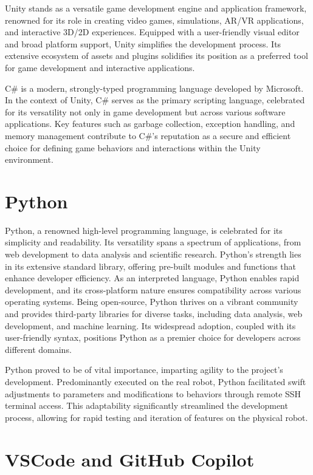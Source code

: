 \documentclass{Configuration_Files/PoliMi3i_thesis}
\begin{document}
Unity stands as a versatile game development engine and application framework, renowned for its role in creating video games, simulations, AR/VR applications, and interactive 3D/2D experiences. Equipped with a user-friendly visual editor and broad platform support, Unity simplifies the development process. Its extensive ecosystem of assets and plugins solidifies its position as a preferred tool for game development and interactive applications.

C\# is a modern, strongly-typed programming language developed by Microsoft. In the context of Unity, C\# serves as the primary scripting language, celebrated for its versatility not only in game development but across various software applications. Key features such as garbage collection, exception handling, and memory management contribute to C\#'s reputation as a secure and efficient choice for defining game behaviors and interactions within the Unity environment.

 

\section{Python}

Python, a renowned high-level programming language, is celebrated for its simplicity and readability. Its versatility spans a spectrum of applications, from web development to data analysis and scientific research. Python's strength lies in its extensive standard library, offering pre-built modules and functions that enhance developer efficiency. As an interpreted language, Python enables rapid development, and its cross-platform nature ensures compatibility across various operating systems. Being open-source, Python thrives on a vibrant community and provides third-party libraries for diverse tasks, including data analysis, web development, and machine learning. Its widespread adoption, coupled with its user-friendly syntax, positions Python as a premier choice for developers across different domains.

Python proved to be of vital importance, imparting agility to the project's development. Predominantly executed on the real robot, Python facilitated swift adjustments to parameters and modifications to behaviors through remote SSH terminal access. This adaptability significantly streamlined the development process, allowing for rapid testing and iteration of features on the physical robot.

 

\section{VSCode and GitHub Copilot}
\end{document}
